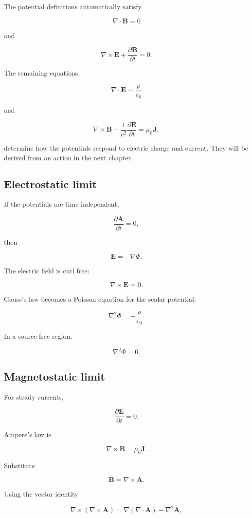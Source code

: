 The potential definitions automatically satisfy

\[
\nabla\cdot\mathbf{B}=0
\]

and

\[
\nabla\times\mathbf{E}
+
\frac{\partial\mathbf{B}}{\partial t}=0.
\]

The remaining equations,

\[
\nabla\cdot\mathbf{E}
=
\frac{\rho}{\varepsilon_0}
\]

and

\[
\nabla\times\mathbf{B}
-
\frac{1}{c^2}
\frac{\partial\mathbf{E}}{\partial t}
=
\mu_0\mathbf{J},
\]

determine how the potentials respond to electric charge and current. They will be derived from an action in the next chapter.

\subsection{Electrostatic limit}

If the potentials are time independent,

\[
\frac{\partial\mathbf{A}}{\partial t}=0,
\]

then

\[
\mathbf{E}
=
-\nabla\Phi.
\]

The electric field is curl free:

\[
\nabla\times\mathbf{E}=0.
\]

Gauss's law becomes a Poisson equation for the scalar potential:

\[
\boxed{
\nabla^2\Phi
=
-
\frac{\rho}{\varepsilon_0}
}.
\]

In a source-free region,

\[
\nabla^2\Phi=0.
\]

\subsection{Magnetostatic limit}

For steady currents,

\[
\frac{\partial\mathbf{E}}{\partial t}=0.
\]

Ampere's law is

\[
\nabla\times\mathbf{B}
=
\mu_0\mathbf{J}.
\]

Substitute

\[
\mathbf{B}
=
\nabla\times\mathbf{A}.
\]

Using the vector identity

\[
\nabla\times
\left(
\nabla\times\mathbf{A}
\right)
=
\nabla
\left(
\nabla\cdot\mathbf{A}
\right)
-
\nabla^2\mathbf{A},
\]

